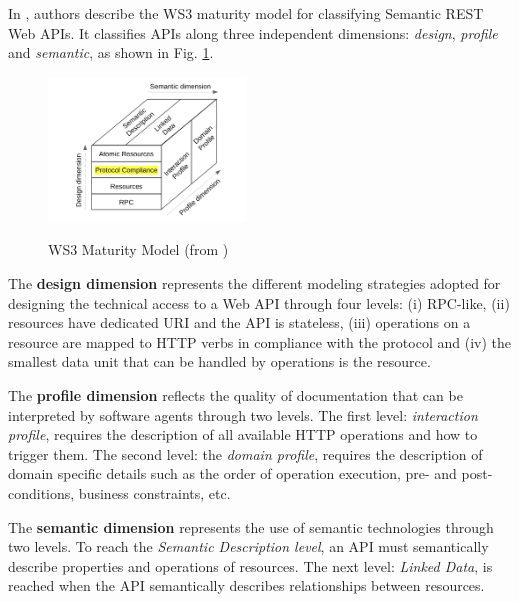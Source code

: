 In \cite{7195633}, authors describe the WS3 maturity model for classifying Semantic REST Web APIs. 
It classifies APIs along three independent dimensions: \textit{design}, \textit{profile} and \textit{semantic}, as shown in Fig. \ref{WS3}.

\begin{figure}[ht]
  \caption{WS3 Maturity Model (from \cite{7195633})}
  \centering
  \includegraphics[width=0.47\textwidth]{figures/ws3-maturity-model.png}
  \label{WS3}
\end{figure}

The \textbf{design dimension} represents the different modeling strategies adopted for designing the technical access to a Web API through four levels: 
(i) RPC-like, (ii) resources have dedicated URI and the API is stateless, (iii) operations on a resource are mapped to HTTP verbs in compliance with the protocol and (iv) the smallest data unit that can be handled by operations is the resource.

The \textbf{profile dimension} reflects the quality of documentation that can be interpreted by software agents through two levels. The first level: \textit{interaction profile}, requires the description of all available HTTP operations and how to trigger them. The second level: the \textit{domain profile}, requires the description of domain specific details such as the order of operation execution, pre- and post-conditions, business constraints, etc.

The \textbf{semantic dimension} represents the use of semantic technologies through two levels. To reach the \textit{Semantic Description level}, an API must semantically describe properties and operations of resources. The next level: \textit{Linked Data}, is reached when the API semantically describes relationships between resources.

